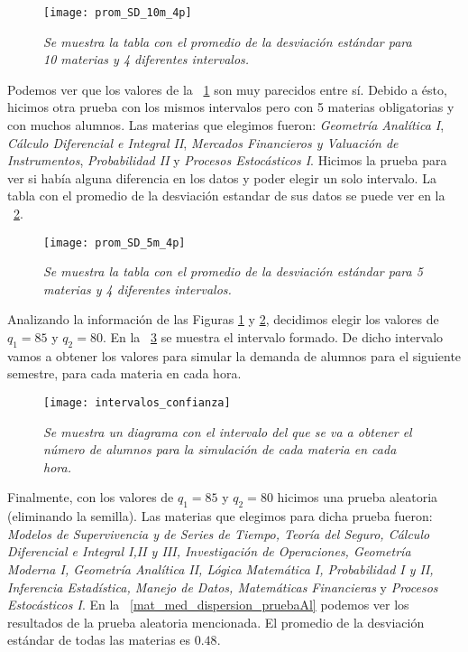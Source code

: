 \begin{figure}[H]
\centering
\texttt{[image: prom\_SD\_10m\_4p]} %
\caption[\textit{Promedio de la desviación estándar: 10 materias, 4 intervalos}]{\textit{Se muestra la tabla con el promedio de la desviación estándar para 10 materias y 4 diferentes intervalos.}}\label{promSD_10m_4p}
\end{figure}

Podemos ver que los valores de la \figurename{~\ref{promSD_10m_4p}} son muy parecidos entre sí. Debido a ésto, hicimos otra prueba con los mismos intervalos pero con 5 materias obligatorias y con muchos alumnos. Las materias que elegimos fueron: \textit{Geometría Analítica I}, \textit{Cálculo Diferencial e Integral II}, \textit{Mercados Financieros y Valuación de Instrumentos}, \textit{Probabilidad II} y \textit{Procesos Estocásticos I}. Hicimos la prueba para ver si había alguna diferencia en los datos y poder elegir un solo intervalo. La tabla con el promedio de la desviación estandar de sus datos se puede ver en la \figurename{~\ref{promSD_5m_4p}}.


\begin{figure}[H]
\centering
\texttt{[image: prom\_SD\_5m\_4p]} %
\caption[\textit{Promedio de la desviación estándar: 5 materias, 4 intervalos}]{\textit{Se muestra la tabla con el promedio de la desviación estándar para 5 materias y 4 diferentes intervalos.}}\label{promSD_5m_4p}
\end{figure}

Analizando la información de las Figuras \ref{promSD_10m_4p} y \ref{promSD_5m_4p}, decidimos elegir los valores de $q_{1} = 85$ y $q_{2} = 80$. En la \figurename{~\ref{interConf}} se muestra el intervalo formado. De dicho intervalo vamos a obtener los valores para simular la demanda de alumnos para el siguiente semestre, para cada materia en cada hora.

\begin{figure}[H]
\centering
\texttt{[image: intervalos\_confianza]} %
\caption[\textit{Diagrama de los intervalos de confianza}]{\textit{Se muestra un diagrama con el intervalo del que se va a obtener el número de alumnos para la simulación de cada materia en cada hora.}}\label{interConf}
\end{figure}

Finalmente, con los valores de $q_{1} = 85$ y $q_{2} = 80$ hicimos una prueba aleatoria (eliminando la semilla). Las materias que elegimos para dicha prueba fueron: \textit{Modelos de Supervivencia y de Series de Tiempo, Teoría del Seguro, Cálculo Diferencial e Integral I,II y III, Investigación de Operaciones, Geometría Moderna I, Geometría Analítica II, Lógica Matemática I, Probabilidad I y II, Inferencia Estadística, Manejo de Datos, Matemáticas Financieras} y \textit{Procesos Estocásticos I}. En la \figurename{~\ref{mat_med_dispersion_pruebaAl}} podemos ver los resultados de la prueba aleatoria mencionada. El promedio de la desviación estándar de todas las materias es $0.48$.%


